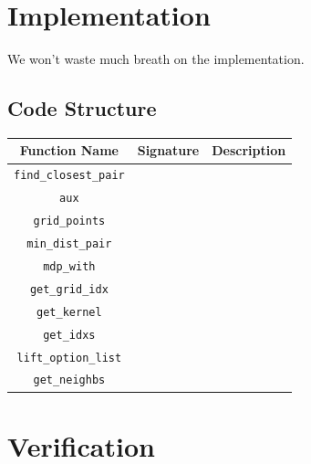 \documentclass{article}
\begin{document}


\section{Implementation}
We won't waste much breath on the implementation.

\subsection{Code Structure}
\begin{center}
\begin{tabular} {|| c | c | c ||}
  \hline
  Function Name & Signature & Description \\
  \hline
  \hline
  \texttt{find\_closest\_pair} & & \\
  \hline
  \texttt{aux} & & \\
  \hline
  \texttt{grid\_points} & & \\
  \hline
  \texttt{min\_dist\_pair} & & \\
  \hline
  \texttt{mdp\_with} & & \\
  \hline
  \texttt{get\_grid\_idx} & & \\
  \hline
  \texttt{get\_kernel} & & \\
  \hline
  \texttt{get\_idxs} & & \\
  \hline
  \texttt{lift\_option\_list} & & \\
  \hline
  \texttt{get\_neighbs} & & \\
  \hline
\end{tabular}
\end{center}


\section{Verification}
\end{document}
